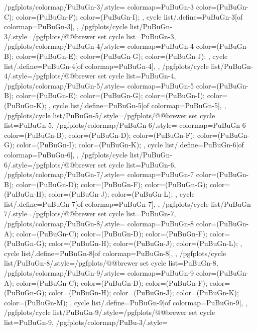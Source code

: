 {  %
  /pgfplots/colormap/PuBuGn-3/.style={
    colormap={PuBuGn-3}{
      color=(PuBuGn-C);
      color=(PuBuGn-F);
      color=(PuBuGn-I);
    },
    cycle list/.define={PuBuGn-3}{[of colormap=PuBuGn-3]},
  },
  /pgfplots/cycle list/PuBuGn-3/.style={/pgfplots/@@brewer set cycle list={PuBuGn-3}},
  /pgfplots/colormap/PuBuGn-4/.style={
    colormap={PuBuGn-4}{
      color=(PuBuGn-B);
      color=(PuBuGn-E);
      color=(PuBuGn-G);
      color=(PuBuGn-J);
    },
    cycle list/.define={PuBuGn-4}{[of colormap=PuBuGn-4]},
  },
  /pgfplots/cycle list/PuBuGn-4/.style={/pgfplots/@@brewer set cycle list={PuBuGn-4}},
  /pgfplots/colormap/PuBuGn-5/.style={
    colormap={PuBuGn-5}{
      color=(PuBuGn-B);
      color=(PuBuGn-E);
      color=(PuBuGn-G);
      color=(PuBuGn-I);
      color=(PuBuGn-K);
    },
    cycle list/.define={PuBuGn-5}{[of colormap=PuBuGn-5]},
  },
  /pgfplots/cycle list/PuBuGn-5/.style={/pgfplots/@@brewer set cycle list={PuBuGn-5}},
  /pgfplots/colormap/PuBuGn-6/.style={
    colormap={PuBuGn-6}{
      color=(PuBuGn-B);
      color=(PuBuGn-D);
      color=(PuBuGn-F);
      color=(PuBuGn-G);
      color=(PuBuGn-I);
      color=(PuBuGn-K);
    },
    cycle list/.define={PuBuGn-6}{[of colormap=PuBuGn-6]},
  },
  /pgfplots/cycle list/PuBuGn-6/.style={/pgfplots/@@brewer set cycle list={PuBuGn-6}},
  /pgfplots/colormap/PuBuGn-7/.style={
    colormap={PuBuGn-7}{
      color=(PuBuGn-B);
      color=(PuBuGn-D);
      color=(PuBuGn-F);
      color=(PuBuGn-G);
      color=(PuBuGn-H);
      color=(PuBuGn-J);
      color=(PuBuGn-L);
    },
    cycle list/.define={PuBuGn-7}{[of colormap=PuBuGn-7]},
  },
  /pgfplots/cycle list/PuBuGn-7/.style={/pgfplots/@@brewer set cycle list={PuBuGn-7}},
  /pgfplots/colormap/PuBuGn-8/.style={
    colormap={PuBuGn-8}{
      color=(PuBuGn-A);
      color=(PuBuGn-C);
      color=(PuBuGn-D);
      color=(PuBuGn-F);
      color=(PuBuGn-G);
      color=(PuBuGn-H);
      color=(PuBuGn-J);
      color=(PuBuGn-L);
    },
    cycle list/.define={PuBuGn-8}{[of colormap=PuBuGn-8]},
  },
  /pgfplots/cycle list/PuBuGn-8/.style={/pgfplots/@@brewer set cycle list={PuBuGn-8}},
  /pgfplots/colormap/PuBuGn-9/.style={
    colormap={PuBuGn-9}{
      color=(PuBuGn-A);
      color=(PuBuGn-C);
      color=(PuBuGn-D);
      color=(PuBuGn-F);
      color=(PuBuGn-G);
      color=(PuBuGn-H);
      color=(PuBuGn-J);
      color=(PuBuGn-K);
      color=(PuBuGn-M);
    },
    cycle list/.define={PuBuGn-9}{[of colormap=PuBuGn-9]},
  },
  /pgfplots/cycle list/PuBuGn-9/.style={/pgfplots/@@brewer set cycle list={PuBuGn-9}},
  /pgfplots/colormap/PuBu-3/.style={
}}
